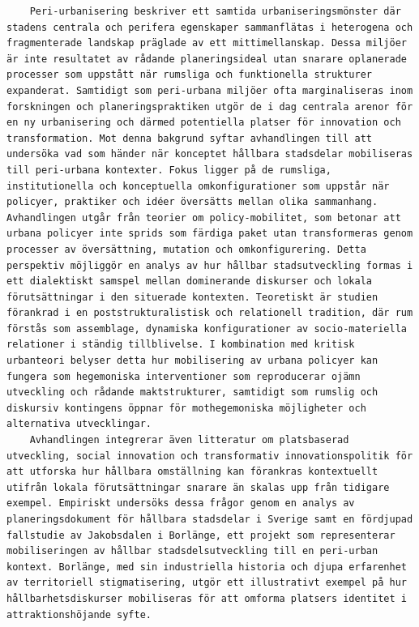 \begin{casestudySection}
\begin{lstlisting}
    Peri-urbanisering beskriver ett samtida urbaniseringsmönster där stadens centrala och perifera egenskaper sammanflätas i heterogena och fragmenterade landskap präglade av ett mittimellanskap. Dessa miljöer är inte resultatet av rådande planeringsideal utan snarare oplanerade processer som uppstått när rumsliga och funktionella strukturer expanderat. Samtidigt som peri-urbana miljöer ofta marginaliseras inom forskningen och planeringspraktiken utgör de i dag centrala arenor för en ny urbanisering och därmed potentiella platser för innovation och transformation. Mot denna bakgrund syftar avhandlingen till att undersöka vad som händer när konceptet hållbara stadsdelar mobiliseras till peri-urbana kontexter. Fokus ligger på de rumsliga, institutionella och konceptuella omkonfigurationer som uppstår när policyer, praktiker och idéer översätts mellan olika sammanhang. Avhandlingen utgår från teorier om policy-mobilitet, som betonar att urbana policyer inte sprids som färdiga paket utan transformeras genom processer av översättning, mutation och omkonfigurering. Detta perspektiv möjliggör en analys av hur hållbar stadsutveckling formas i ett dialektiskt samspel mellan dominerande diskurser och lokala förutsättningar i den situerade kontexten. Teoretiskt är studien förankrad i en poststrukturalistisk och relationell tradition, där rum förstås som assemblage, dynamiska konfigurationer av socio-materiella relationer i ständig tillblivelse. I kombination med kritisk urbanteori belyser detta hur mobilisering av urbana policyer kan fungera som hegemoniska interventioner som reproducerar ojämn utveckling och rådande maktstrukturer, samtidigt som rumslig och diskursiv kontingens öppnar för mothegemoniska möjligheter och alternativa utvecklingar.
    Avhandlingen integrerar även litteratur om platsbaserad utveckling, social innovation och transformativ innovationspolitik för att utforska hur hållbara omställning kan förankras kontextuellt utifrån lokala förutsättningar snarare än skalas upp från tidigare exempel. Empiriskt undersöks dessa frågor genom en analys av planeringsdokument för hållbara stadsdelar i Sverige samt en fördjupad fallstudie av Jakobsdalen i Borlänge, ett projekt som representerar mobiliseringen av hållbar stadsdelsutveckling till en peri-urban kontext. Borlänge, med sin industriella historia och djupa erfarenhet av territoriell stigmatisering, utgör ett illustrativt exempel på hur hållbarhetsdiskurser mobiliseras för att omforma platsers identitet i attraktionshöjande syfte.

\end{lstlisting}
\end{casestudySection}
